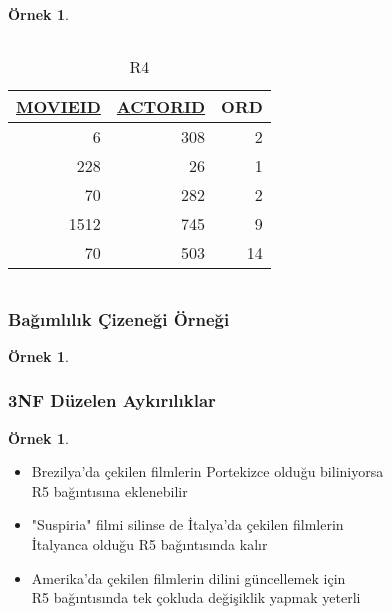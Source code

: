 \documentclass[dvipsnames]{beamer}
\theoremstyle{definition}
\theoremstyle{example}
\newtheorem{ornek}[theorem]{Örnek}
\theoremstyle{plain}
\begin{document}
\begin{frame}
\begin{ornek}
\begin{columns}[t]
      \begin{tiny}
      \begin{table}
        \caption{R4}
        \begin{tabular}{|r|r|r|}\hline
\underline{MOVIEID} & \underline{ACTORID} & ORD\\[2pt]\hline\hline
   6 & 308 &  2\\\hline
 228 &  26 &  1\\\hline
  70 & 282 &  2\\\hline
1512 & 745 &  9\\\hline
  70 & 503 & 14\\\hline
        \end{tabular}
      \end{table}
      \end{tiny}
    \end{columns}
  \end{ornek}
\end{frame}

\begin{frame}
  \frametitle{Bağımlılık Çizeneği Örneği}

  \begin{ornek}
    \begin{center}
    \end{center}
  \end{ornek}
 \end{frame}

\begin{frame}
  \frametitle{3NF Düzelen Aykırılıklar}

  \begin{ornek}
    \begin{itemize}
      \item Brezilya'da çekilen filmlerin Portekizce olduğu biliniyorsa\\
	R5 bağıntısına eklenebilir

      \pause
      \item "Suspiria" filmi silinse de İtalya'da çekilen filmlerin\\
	İtalyanca olduğu R5 bağıntısında kalır

      \pause
      \item Amerika'da çekilen filmlerin dilini güncellemek için\\
	R5 bağıntısında tek çokluda değişiklik yapmak yeterli
    \end{itemize}
  \end{ornek}
\end{frame}
\end{document}
